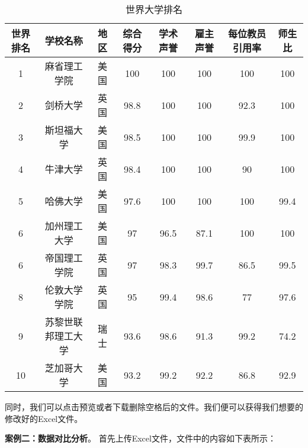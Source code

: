 \begin{table}[h]
    \centering
    \caption{世界大学排名}
    \footnotesize
    \begin{tabular}{cccccccc}
        \toprule
        世界排名 & 学校名称 & 地区 & 综合得分 & 学术声誉 & 雇主声誉 & 每位教员引用率 & 师生比 \\
        \midrule
        1  & 麻省理工学院     & 美国 & 100  & 100  & 100  & 100  & 100  \\
        2  & 剑桥大学         & 英国 & 98.8 & 100  & 100  & 92.3 & 100  \\
        3  & 斯坦福大学       & 美国 & 98.5 & 100  & 100  & 99.9 & 100  \\
        4  & 牛津大学         & 英国 & 98.4 & 100  & 100  & 90   & 100  \\
        5  & 哈佛大学         & 美国 & 97.6 & 100  & 100  & 100  & 99.4 \\
        6  & 加州理工大学     & 美国 & 97   & 96.5 & 87.1 & 100  & 100  \\
        6  & 帝国理工学院     & 英国 & 97   & 98.3 & 99.7 & 86.5 & 99.5 \\
        8  & 伦敦大学学院     & 英国 & 95   & 99.4 & 98.6 & 77   & 97.6 \\
        9  & 苏黎世联邦理工大学 & 瑞士 & 93.6 & 98.6 & 91.3 & 99.2 & 74.2 \\
        10 & 芝加哥大学       & 美国 & 93.2 & 99.2 & 92.2 & 86.8 & 92.9 \\
        \bottomrule
    \end{tabular}
    
    \label{tab:world_ranking2}
\end{table}
\FloatBarrier
同时，我们可以点击预览或者下载删除空格后的文件。我们便可以获得我们想要的修改好的Excel文件。


\textbf{案例二：数据对比分析}。
首先上传Excel文件，文件中的内容如下表所示：

